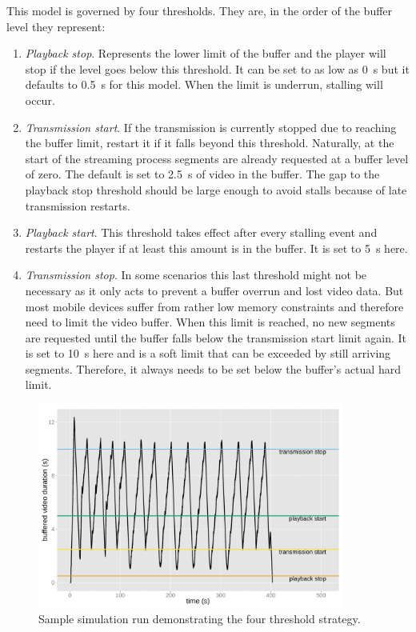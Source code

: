 This model is governed by four thresholds. They are, in the order of the buffer level they represent:

\begin{enumerate}
	\item \textit{Playback stop}. Represents the lower limit of the buffer and the player will stop if the level goes below this threshold. It can be set to as low as \SI{0}{\second} but it defaults to \SI{0.5}{\second} for this model. When the limit is underrun, stalling will occur.

	\item \textit{Transmission start}. If the transmission is currently stopped due to reaching the buffer limit, restart it if it falls beyond this threshold. Naturally, at the start of the streaming process segments are already requested at a buffer level of zero. The default is set to \SI{2.5}{\second} of video in the buffer. The gap to the playback stop threshold should be large enough to avoid stalls because of late transmission restarts.

	\item \textit{Playback start}. This threshold takes effect after every stalling event and restarts the player if at least this amount is in the buffer. It is set to \SI{5}{\second} here.

	\item \textit{Transmission stop}. In some scenarios this last threshold might not be necessary as it only acts to prevent a buffer overrun and lost video data. But most mobile devices suffer from rather low memory constraints and therefore need to limit the video buffer. When this limit is reached, no new segments are requested until the buffer falls below the transmission start limit again. It is set to \SI{10}{\second} here and is a soft limit that can be exceeded by still arriving segments. Therefore, it always needs to be set below the buffer's actual hard limit.
\end{enumerate}


\begin{figure}[htb]
	\centering
	\includegraphics[width=0.9\textwidth]{images/R-ltesim-plotbuffer-time.pdf}
	\caption{Sample simulation run demonstrating the four threshold strategy.}
\label{c6:fig:ltesim-plotbuffer-time}
\end{figure}

